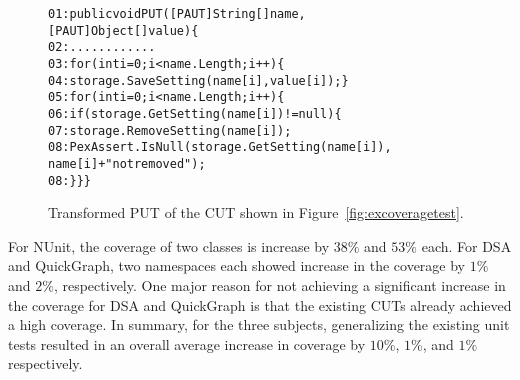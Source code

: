 \begin{figure}[t]
\begin{CodeOut}
\begin{alltt}
01: public void PUT([PAUT]String[] name, 
\hspace*{1.7in}[PAUT]Object[] value) \{
02: \hspace*{0.07in}............
03: \hspace*{0.07in}for (int i = 0; i < name.Length; i++) \{
04: \hspace*{0.22in}storage.SaveSetting(name[i], value[i]); \}
05: \hspace*{0.07in}for (int i = 0; i < name.Length; i++) \{
06: \hspace*{0.17in}if (storage.GetSetting(name[i]) != null) \{
07: \hspace*{0.3in}storage.RemoveSetting(name[i]);
08: \hspace*{0.3in}PexAssert.IsNull(storage.GetSetting(name[i]), 
\hspace*{1.5in}name[i] + " not removed"); 
08: \hspace*{0.1in}\}\}\}
\end{alltt}
\end{CodeOut} \vspace*{-3ex}
\caption{Transformed PUT of the CUT shown in Figure~\ref{fig:excoveragetest}.} \vspace*{-4ex}
\label{fig:excoveragePUT}%
\end{figure}

For NUnit, the coverage of two classes is increase by $38\%$ and $53\%$ each. For DSA and QuickGraph, two namespaces each showed increase in the coverage by $1\%$ and $2\%$, respectively. One major reason for not achieving a significant increase in the coverage for DSA and QuickGraph is that the existing CUTs already achieved a high coverage. In summary, for the three subjects, generalizing the existing unit tests resulted in an overall average increase in coverage by $10\%$, $1\%$, and $1\%$ respectively. 

